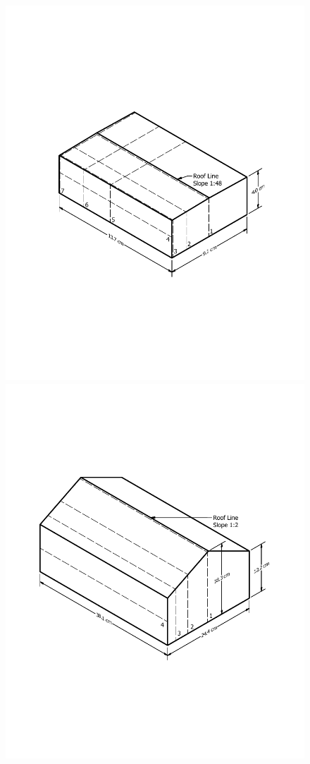 \begin{figure}[!ht]
\centering
\includegraphics[width=5.5in]{FIGURES/UWO_Wind_Tunnel/UWO-BLT-SS20-Test7}
\includegraphics[width=5.5in]{FIGURES/UWO_Wind_Tunnel/UWO-BLWT-SS21-Test6-40ft}

\end{figure}

